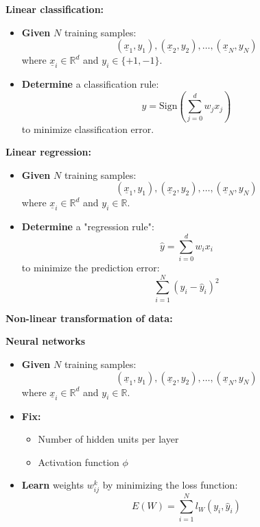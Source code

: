     \begin{example}
        \textbf{Linear classification:}

        \begin{itemize}
            \item \textbf{Given} \( N \) training samples:
            \[
            (\underline{x}_1, y_1), (\underline{x}_2, y_2), \dots, (\underline{x}_N, y_N)
            \]
            where \( \underline{x}_i \in \mathbb{R}^d \) and \( y_i \in \{ +1, -1 \} \).
            
            \item \textbf{Determine} a classification rule:
            \[
            y = \text{Sign} \left( \sum_{j=0}^{d} w_j x_j \right)
            \]
            to minimize classification error.
        \end{itemize}

        \textbf{Linear regression:}
        \begin{itemize}
            \item \textbf{Given} \( N \) training samples:
            \[
            (\underline{x}_1, y_1), (\underline{x}_2, y_2), \dots, (\underline{x}_N, y_N)
            \]
            where \( \underline{x}_i \in \mathbb{R}^d \) and \( y_i \in \mathbb{R} \).
            
            \item \textbf{Determine} a "regression rule":
            \[
            \hat{y} = \sum_{i=0}^{d} w_i x_i
            \]
            to minimize the prediction error:
            \[
            \sum_{i=1}^{N} \left( y_i - \hat{y}_i \right)^2
            \]
        \end{itemize}

        \textbf{Non-linear transformation of data:}

        \textbf{Neural networks}
        \begin{itemize}
            \item \textbf{Given} \( N \) training samples:
            \[
            (\underline{x}_1, y_1), (\underline{x}_2, y_2), \dots, (\underline{x}_N, y_N)
            \]
            where \( \underline{x}_i \in \mathbb{R}^d \) and \( y_i \in \mathbb{R} \).
            
            \item \textbf{Fix:}
            \begin{itemize}
                \item Number of hidden units per layer
                \item Activation function \( \phi \)
            \end{itemize}
            
            \item \textbf{Learn} weights \( w_{ij}^k \) by minimizing the loss function:
            \[
            E(W) = \sum_{i=1}^{N} l_W(y_i, \hat{y}_i)
            \]
        \end{itemize}
    \end{example}

